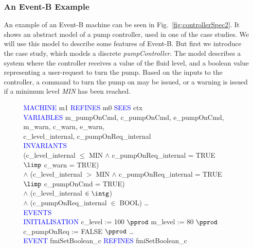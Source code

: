 \subsubsection{An Event-B Example}
An example of an Event-B machine can be seen in Fig.~\ref{fig:controllerSpec2}. It shows an abstract model of a pump controller, used in one of the case studies. We will use this model to describe some features of Event-B. But first we introduce the case study, which models a discrete \emph{pumpController}. The model describes a system where the controller receives a value of the fluid level, and a boolean value representing a user-request to turn the pump. Based on the inputs to the controller, a command to turn the pump on may be issued, or a warning is issued if a minimum level \emph{MIN} has been reached.    
%
%
%
\begin{figure}[h]
\centering
\begin{minipage}{0.8\textwidth}
\textcolor{blue}{MACHINE} m1 \textcolor{blue}{REFINES} m0 \textcolor{blue}{SEES} ctx \\
\textcolor{blue}{VARIABLES}  \hspace*{0.2cm} m\_pumpOnCmd, c\_pumpOnCmd, e\_pumpOnCmd, m\_warn, c\_warn, e\_warn,\\
\hspace*{0.2cm} c\_level\_internal, c\_pumpOnReq\_internal\\
\textcolor{blue}{INVARIANTS}\\
\hspace*{0.2cm}(c\_level\_internal $\leq$ MIN $\land$  c\_pumpOnReq\_internal = TRUE $\limp$  c\_warn = TRUE)\\
\hspace*{0.2cm} $\land$ (c\_level\_internal $>$  MIN $\land$  c\_pumpOnReq\_internal = TRUE\\
\hspace*{0.5cm} $\limp$  c\_pumpOnCmd = TRUE)\\
\hspace*{0.2cm} $\land$ (c\_level\_internal $\in  \intg$)\\
\hspace*{0.2cm} $\land$ (c\_pumpOnReq\_internal $\in$  BOOL) \ldots\\
\textcolor{blue}{EVENTS}\\
\textcolor{blue}{INITIALISATION} c\_level :=  100 $\pprod$ m\_level := 80 $\pprod$ c\_pumpOnReq :=  FALSE $\pprod$ \ldots\\
\textcolor{blue}{EVENT} fmiSetBoolean\_c \textcolor{blue}{REFINES} fmiSetBoolean\_c\\

\end{minipage}
\end{figure}
